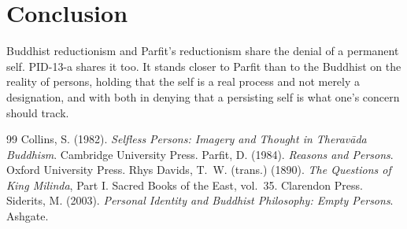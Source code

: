 \documentclass{situationist-preprint}
\begin{document}
\section{Conclusion}

Buddhist reductionism and Parfit's reductionism share the denial of a permanent self. PID-13-a shares it too. It stands closer to Parfit than to the Buddhist on the reality of persons, holding that the self is a real process and not merely a designation, and with both in denying that a persisting self is what one's concern should track.

\begin{thebibliography}{99}\small
{} Collins, S. (1982). \emph{Selfless Persons: Imagery and Thought in Therav\=ada Buddhism}. Cambridge University Press.
 Parfit, D. (1984). \emph{Reasons and Persons}. Oxford University Press.
 Rhys Davids, T.~W. (trans.) (1890). \emph{The Questions of King Milinda}, Part I. Sacred Books of the East, vol.~35. Clarendon Press.
 Siderits, M. (2003). \emph{Personal Identity and Buddhist Philosophy: Empty Persons}. Ashgate.
\end{thebibliography}
\end{document}
